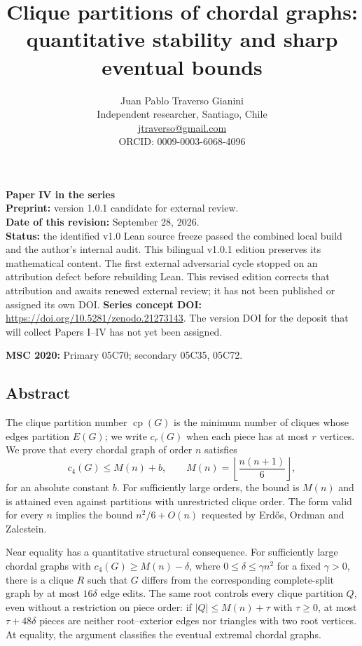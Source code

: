 \documentclass[english,11pt,a4paper]{article}
\title{Clique partitions of chordal graphs:\\quantitative stability and sharp eventual bounds}
\author{Juan Pablo Traverso Gianini\\
\small Independent researcher, Santiago, Chile\\
\small \href{mailto:jtraverso@gmail.com}{jtraverso@gmail.com}\\
\small ORCID: 0009-0003-6068-4096}
\date{}
\begin{document}
\raggedbottom
\maketitle
\textbf{Paper IV in the series}\\
\textbf{Preprint:} version 1.0.1 candidate for external review.\\
\textbf{Date of this revision:} September 28, 2026.\\
\textbf{Status:} the identified v1.0 Lean source freeze passed the combined local build and the author's internal audit. This bilingual v1.0.1 edition preserves its mathematical content. The first external adversarial cycle stopped on an attribution defect before rebuilding Lean. This revised edition corrects that attribution and awaits renewed external review; it has not been published or assigned its own DOI. \textbf{Series concept DOI:} \url{https://doi.org/10.5281/zenodo.21273143}. The version DOI for the deposit that will collect Papers I--IV has not yet been assigned.

\textbf{MSC 2020:} Primary 05C70; secondary 05C35, 05C72.

\subsection{Abstract}\label{abstract}

The clique partition number \(\operatorname{cp}(G)\) is the minimum number of cliques whose edges partition \(E(G)\); we write \(c_r(G)\) when each piece has at most \(r\) vertices. We prove that every chordal graph of order \(n\) satisfies \[
c_4(G)\le M(n)+b,\qquad M(n)=\left\lfloor\frac{n(n+1)}6\right\rfloor,
\] for an absolute constant \(b\). For sufficiently large orders, the bound is \(M(n)\) and is attained even against partitions with unrestricted clique order. The form valid for every \(n\) implies the bound \(n^2/6+O(n)\) requested by Erdős, Ordman and Zalcstein.

Near equality has a quantitative structural consequence. For sufficiently large chordal graphs with \(c_4(G)\ge M(n)-\delta\), where \(0\le\delta\le\gamma n^2\) for a fixed \(\gamma>0\), there is a clique \(R\) such that \(G\) differs from the corresponding complete-split graph by at most \(16\delta\) edge edits. The same root controls every clique partition \(Q\), even without a restriction on piece order: if \(|Q|\le M(n)+\tau\) with \(\tau\ge0\), at most \(\tau+48\delta\) pieces are neither root--exterior edges nor triangles with two root vertices. At equality, the argument classifies the eventual extremal chordal graphs.
\end{document}
